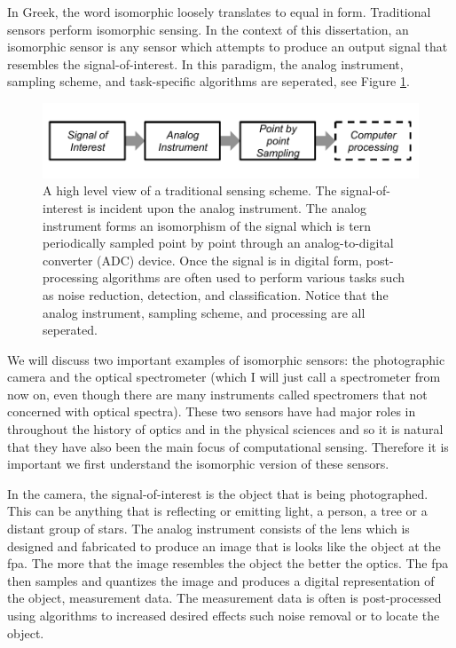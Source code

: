 In Greek, the word isomorphic loosely translates to equal in form. Traditional sensors perform isomorphic sensing. In the context of this dissertation, an isomorphic sensor is any sensor which attempts to produce an output signal that resembles the signal-of-interest. In this paradigm, the analog instrument, sampling scheme, and task-specific algorithms are seperated, see Figure \ref{fig:isomorphicsesingflowchart}.


\begin{figure}
    \centering
    \includegraphics[scale=1]{isomorphicsensorflowchart}
    \caption{A high level view of a traditional sensing scheme. The signal-of-interest is incident upon the analog instrument. The analog instrument forms an isomorphism of the signal which is tern periodically sampled point by point through an analog-to-digital converter (ADC) device. Once the signal is in digital form, post-processing algorithms are often used to perform various tasks such as noise reduction, detection, and classification. Notice that the analog instrument, sampling scheme, and processing are all seperated. }
    \label{fig:isomorphicsesingflowchart}
\end{figure}

We will discuss two important examples of isomorphic sensors: the photographic camera and the optical spectrometer (which I will just call a spectrometer from now on, even though there are many instruments called spectromers that not concerned with optical spectra). These two sensors have had major roles in throughout the history of optics and in the physical sciences and so it is natural that they have also been the main focus of computational sensing. Therefore it is important we first understand the isomorphic version of these sensors.

In the camera, the signal-of-interest is the object that is being photographed. This can be anything that is reflecting or emitting light, a person, a tree or a distant group of stars. The analog instrument consists of the lens which is designed and fabricated to produce an image that is looks like the object at the \gls{fpa}. The more that the image resembles the object the better the optics. The \gls{fpa} then samples and quantizes the image and produces a digital representation of the object, measurement data. The measurement data is often is post-processed using algorithms to increased desired effects such noise removal or to locate the object. 

